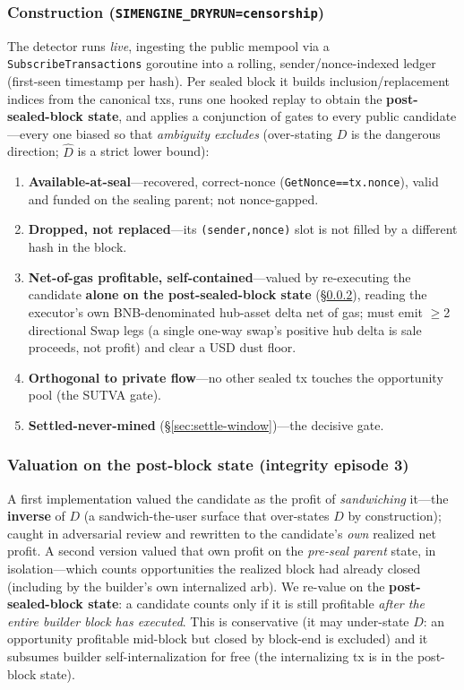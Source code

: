 \documentclass[11pt]{article}
\newcommand{\code}[1]{\texttt{#1}}
\begin{document}
\subsubsection{Construction (\code{SIMENGINE\_DRYRUN=censorship})}
The detector runs \emph{live}, ingesting the public mempool via a
\code{SubscribeTransactions} goroutine into a rolling, sender/nonce-indexed ledger
(first-seen timestamp per hash). Per sealed block it builds inclusion/replacement
indices from the canonical txs, runs one hooked replay to obtain the
\textbf{post-sealed-block state}, and applies a conjunction of gates to every public
candidate---every one biased so that \emph{ambiguity excludes} (over-stating $D$ is the
dangerous direction; $\hat D$ is a strict lower bound):
\begin{enumerate}
  \item \textbf{Available-at-seal}---recovered, correct-nonce
    (\code{GetNonce==tx.nonce}), valid and funded on the sealing parent; not
    nonce-gapped.
  \item \textbf{Dropped, not replaced}---its \code{(sender,nonce)} slot is not filled by
    a different hash in the block.
  \item \textbf{Net-of-gas profitable, self-contained}---valued by re-executing the
    candidate \textbf{alone on the post-sealed-block state} (\S\ref{sec:censorship-val}),
    reading the executor's own BNB-denominated hub-asset delta net of gas; must emit
    $\geq$2 directional Swap legs (a single one-way swap's positive hub delta is sale
    proceeds, not profit) and clear a USD dust floor.
  \item \textbf{Orthogonal to private flow}---no other sealed tx touches the opportunity
    pool (the SUTVA gate).
  \item \textbf{Settled-never-mined} (\S\ref{sec:settle-window})---the decisive gate.
\end{enumerate}

\subsubsection{Valuation on the post-block state (integrity episode 3)}
\label{sec:censorship-val}
A first implementation valued the candidate as the profit of \emph{sandwiching} it---the
\textbf{inverse} of $D$ (a sandwich-the-user surface that over-states $D$ by
construction); caught in adversarial review and rewritten to the candidate's \emph{own}
realized net profit. A second version valued that own profit on the \emph{pre-seal
parent} state, in isolation---which counts opportunities the realized block had already
closed (including by the builder's own internalized arb). We re-value on the
\textbf{post-sealed-block state}: a candidate counts only if it is still profitable
\emph{after the entire builder block has executed}. This is conservative (it may
under-state $D$: an opportunity profitable mid-block but closed by block-end is
excluded) and it subsumes builder self-internalization for free (the internalizing tx is
in the post-block state).
\end{document}
